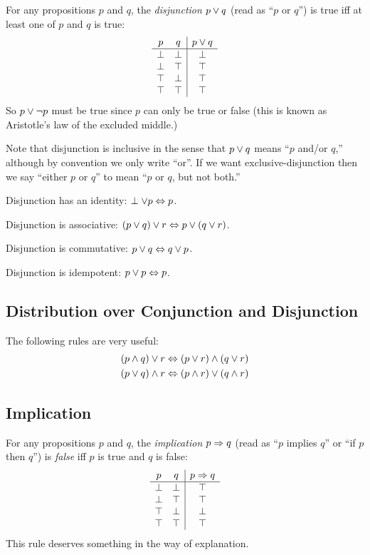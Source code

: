 For any propositions $p$ and $q$, the \emph{disjunction} $p \vee q$
(read as ``$p$ or $q$'') is true iff at least one of $p$ and $q$ is
true:
\[
\begin{array}{cc|c}
p       & q       & p \vee q \\
\hline
\perp  & \perp  & \perp \\
\perp  & \top   & \top \\
\top   & \perp  & \top \\
\top   & \top   & \top \\
\end{array}
\]
So $p \vee \neg{}p$ must be true since $p$ can only be true or false
(this is known as Aristotle's law of the excluded middle.)

Note that disjunction is inclusive in the sense that $p \vee q$ means
``$p$ and/or $q$,'' although by convention we only write ``or''.  If we
want exclusive-disjunction then we say ``either $p$ or $q$'' to mean
``$p$ or $q$, but not both.''

Disjunction has an identity: $\perp \vee p \Leftrightarrow p$.

Disjunction is associative: $(p \vee q) \vee r \Leftrightarrow p \vee (q \vee r)$.

Disjunction is commutative: $p \vee q \Leftrightarrow q \vee p$.

Disjunction is idempotent: $p \vee p \Leftrightarrow p$.

\subsection{Distribution over Conjunction and Disjunction}

The following rules are very useful:
\begin{align*}
(p \wedge q) \vee r
& \Leftrightarrow (p \vee r) \wedge (q \vee r) \\
(p \vee q) \wedge r
& \Leftrightarrow (p \wedge r) \vee (q \wedge r) \\
\end{align*}

\subsection{Implication}

For any propositions $p$ and $q$, the \emph{implication} $p \Rightarrow q$
(read as ``$p$ implies $q$'' or ``if $p$ then $q$'') is \emph{false} iff 
$p$ is true and $q$ is false:
\[
\begin{array}{cc|c}
p       & q       & p \Rightarrow q \\
\hline
\perp  & \perp  & \top \\
\perp  & \top   & \top \\
\top   & \perp  & \perp \\
\top   & \top   & \top \\
\end{array}
\]
This rule deserves something in the way of explanation.

